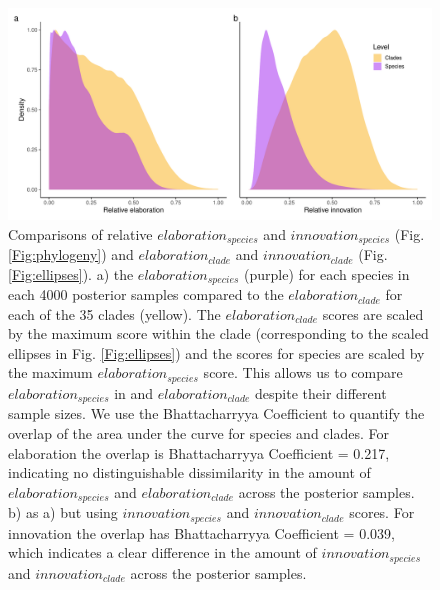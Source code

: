\documentclass[12pt,letterpaper]{article}
\begin{document}
\begin{figure}[!htbp]
\centering
   \includegraphics[width=1\textwidth]{Figures/relative_EI_gg_style_unscaled.pdf}
\caption{Comparisons of relative $elaboration_{species}$ and $innovation_{species}$ (Fig. \ref{Fig:phylogeny}) and $elaboration_{clade}$ and $innovation_{clade}$ (Fig. \ref{Fig:ellipses}).
a) the $elaboration_{species}$ (purple) for each species in each 4000 posterior samples compared to the $elaboration_{clade}$ for each of the 35 clades (yellow).
The $elaboration_{clade}$ scores are scaled by the maximum score within the clade (corresponding to the scaled ellipses in Fig. \ref{Fig:ellipses}) and the scores for species are scaled by the maximum $elaboration_{species}$ score.
This allows us to compare $elaboration_{species}$ in and $elaboration_{clade}$ despite their different sample sizes.
We use the Bhattacharryya Coefficient to quantify the overlap of the area under the curve for species and clades.
For elaboration the overlap is Bhattacharryya Coefficient = 0.217, indicating no distinguishable dissimilarity in the amount of $elaboration_{species}$ and $elaboration_{clade}$ across the posterior samples.
b) as a) but using $innovation_{species}$ and $innovation_{clade}$ scores.
For innovation the overlap has Bhattacharryya Coefficient = 0.039, which indicates a clear difference in the amount of $innovation_{species}$ and $innovation_{clade}$ across the posterior samples.}
\label{Fig:relative_EI}
\end{figure}
\bigskip

\end{document}
